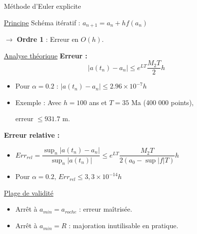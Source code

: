 \documentclass{beamer}
\begin{document}
	\begin{frame}{Méthode d'Euler explicite}
		\begin{block}{\underline{Principe}}
			Schéma itératif : $a_{n+1} = a_n + h f(a_n)$
			
			$\to$ \textbf{Ordre 1} : Erreur en $O(h)$.
		\end{block}\pause
		
		\begin{block}{\underline{Analyse théorique}}
			\textbf{Erreur :}
			\[
			|a(t_n) - a_n| \leq e^{LT} \frac{M_2 T}{2} h
			\]\pause
			\begin{itemize}
				\item Pour $\alpha = 0.2$ : $|a(t_n) - a_n| \leq 2.96 \times 10^{-7} h$ \pause
				\item Exemple : Avec $h = 100$ ans et $T = 35$ Ma (400 000 points),
				\begin{center}
					erreur $\leq 931.7$ m.
				\end{center}
			\end{itemize}\pause
			
			\vspace{.2cm}
			
			\textbf{Erreur relative :} \begin{itemize}
				\item $Err_{rel} = \dfrac{\sup_n\lvert a(t_n)-a_n\rvert}{\sup_n\lvert a(t_n)\rvert} \leq e^{LT}\dfrac{M_2T}{2(a_0-\sup\lvert f \rvert T)}h $\\
				\item Pour $\alpha = 0.2$, $Err_{rel} \leq 3,3\times10^{-14} h$
			\end{itemize}
		\end{block}
		
	\end{frame}
	
	\begin{frame}
		\begin{alertblock}{\underline{Plage de validité}}
			\begin{itemize}
				\item Arrêt à $a_{min} = a_{roche}$ : erreur maîtrisée.\pause
				\item Arrêt à $a_{min} = R$ : majoration inutilisable en pratique.
			\end{itemize}
		\end{alertblock}
	\end{frame}
	
\end{document}
